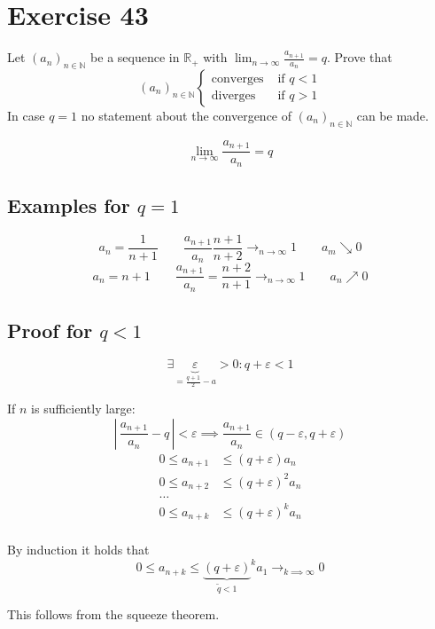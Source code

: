 \documentclass[a4paper]{article}
\theoremstyle{definition}
\newcommand\card[1]{\left|\,#1\,\right|}
\begin{document}
\section{Exercise 43}
\begin{ex}
  Let $(a_n)_{n \in \mathbb N}$ be a sequence in $\mathbb R_+$ with $\lim_{n\to\infty} \frac{a_{n+1}}{a_n} = q$.
  Prove that
  \[
    (a_n)_{n \in \mathbb N}
    \begin{cases}
      \text{converges} & \text{ if } q < 1 \\
      \text{diverges} & \text{ if } q > 1
    \end{cases}
  \]
  In case $q=1$ no statement about the convergence of $(a_n)_{n \in \mathbb N}$ can be made.
\end{ex}

\[ \lim_{n \to \infty} \frac{a_{n+1}}{a_n} = q \]

\subsection{Examples for $q = 1$}

\[ a_n = \frac{1}{n+1} \qquad \frac{a_{n+1}}{a_n} \frac{n+1}{n+2} \to_{n\to\infty} 1 \qquad a_m \searrow 0 \]
\[ a_n = n+1 \qquad \frac{a_{n+1}}{a_n} = \frac{n+2}{n+1} \to_{n\to\infty} 1 \qquad a_n \nearrow 0 \]

\subsection{Proof for $q < 1$}

\[ \exists \underbrace{\varepsilon}_{=\frac{q+1}{2} - a} > 0: q + \varepsilon < 1 \]

If $n$ is sufficiently large:
\[ \card{\frac{a_{n+1}}{a_n} - q} < \varepsilon \implies \frac{a_{n+1}}{a_n} \in (q - \varepsilon, q + \varepsilon) \]
\begin{align*}
  0 \leq a_{n+1} &\leq (q + \varepsilon) a_n \\
  0 \leq a_{n+2} &\leq (q + \varepsilon)^2 a_n \\
           \dots & \\
  0 \leq a_{n+k} &\leq (q + \varepsilon)^k a_n \\
\end{align*}

By induction it holds that
\[ 0 \leq a_{n+k} \leq {\underbrace{(q + \varepsilon)}_{\tilde{q} < 1}}^k a_1 \to_{k\implies\infty} 0 \]

This follows from the squeeze theorem.
\end{document}
